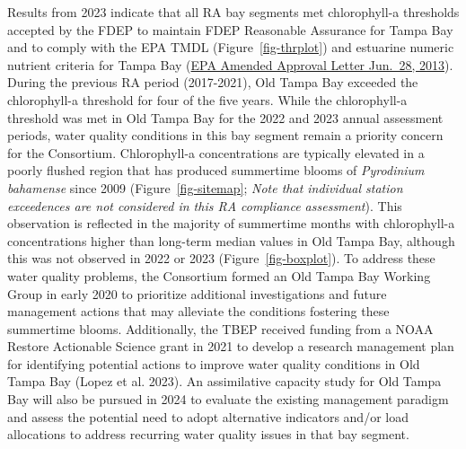 \documentclass[
  letterpaper,
  DIV=11,
  numbers=noendperiod]{scrreport}
\begin{document}
Results from 2023 indicate that all RA bay segments met chlorophyll-a
thresholds accepted by the FDEP to maintain FDEP Reasonable Assurance
for Tampa Bay and to comply with the EPA TMDL (Figure~\ref{fig-thrplot})
and estuarine numeric nutrient criteria for Tampa Bay
(\href{https://www.epa.gov/sites/default/files/2015-04/documents/florida-amended-determination.pdf}{EPA
Amended Approval Letter Jun.~28, 2013}). During the previous RA period
(2017-2021), Old Tampa Bay exceeded the chlorophyll-a threshold for four
of the five years. While the chlorophyll-a threshold was met in Old
Tampa Bay for the 2022 and 2023 annual assessment periods, water quality
conditions in this bay segment remain a priority concern for the
Consortium. Chlorophyll-a concentrations are typically elevated in a
poorly flushed region that has produced summertime blooms of
\emph{Pyrodinium bahamense} since 2009 (Figure~\ref{fig-sitemap};
\emph{Note that individual station exceedences are not considered in
this RA compliance assessment}). This observation is reflected in the
majority of summertime months with chlorophyll-a concentrations higher
than long-term median values in Old Tampa Bay, although this was not
observed in 2022 or 2023 (Figure~\ref{fig-boxplot}). To address these
water quality problems, the Consortium formed an Old Tampa Bay Working
Group in early 2020 to prioritize additional investigations and future
management actions that may alleviate the conditions fostering these
summertime blooms. Additionally, the TBEP received funding from a NOAA
Restore Actionable Science grant in 2021 to develop a research
management plan for identifying potential actions to improve water
quality conditions in Old Tampa Bay (Lopez et al. 2023). An assimilative
capacity study for Old Tampa Bay will also be pursued in 2024 to
evaluate the existing management paradigm and assess the potential need
to adopt alternative indicators and/or load allocations to address
recurring water quality issues in that bay segment.
\end{document}
